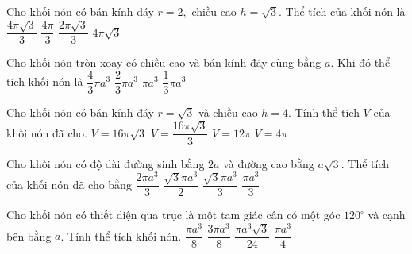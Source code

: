 \begin{ex}
	Cho khối nón có bán kính đáy $r=2,$ chiều cao $h=\sqrt{3}$. Thể tích của khối nón là
	\choice
	{\True $\dfrac{4\pi\sqrt{3}}{3}$}
	{$\dfrac{4\pi}{3}$}
	{$\dfrac{2\pi\sqrt{3}}{3}$}
	{$4\pi\sqrt{3}$}
\end{ex}
\begin{ex}
	Cho khối nón tròn xoay có chiều cao và bán kính đáy cùng bằng $a$. Khi đó thể tích khối nón là
	\choice
	{$\dfrac{4}{3}\pi a^3$}
	{$\dfrac{2}{3}\pi a^3$}
	{$\pi a^3$}
	{\True $\dfrac{1}{3}\pi a^3$}
\end{ex}
\begin{ex}
	Cho khối nón có bán kính đáy $r=\sqrt{3}$ và chiều cao $h=4$. Tính thể tích $V$ của khối nón đã cho. 
	\choice
	{$V=16\pi\sqrt{3}$}
	{$V=\dfrac{16\pi\sqrt{3}}{3}$}
	{$V=12\pi$}
	{\True $V=4\pi$}
\end{ex}
\begin{ex}
	Cho khối nón có độ dài đường sinh bằng $2a$ và đường cao bằng $a\sqrt{3}$. Thể tích của khối nón đã cho bằng
	\choice
	{$\dfrac{2\pi a^3}{3}$}
	{$\dfrac{\sqrt{3}\pi a^3}{2}$}
	{\True $\dfrac{\sqrt{3}\pi a^3}{3}$}
	{$\dfrac{\pi a^3}{3}$}
\end{ex}
\begin{ex}
	Cho khối nón có thiết diện qua trục là một tam giác cân có một góc $120^{\circ}$ và cạnh bên bằng $a$. Tính thể tích khối nón. 
	\choice
	{\True $\dfrac{\pi a^3}{8}$}
	{$\dfrac{3\pi a^3}{8}$}
	{$\dfrac{\pi a^3\sqrt{3}}{24}$}
	{$\dfrac{\pi a^3}{4}$}
\end{ex}
